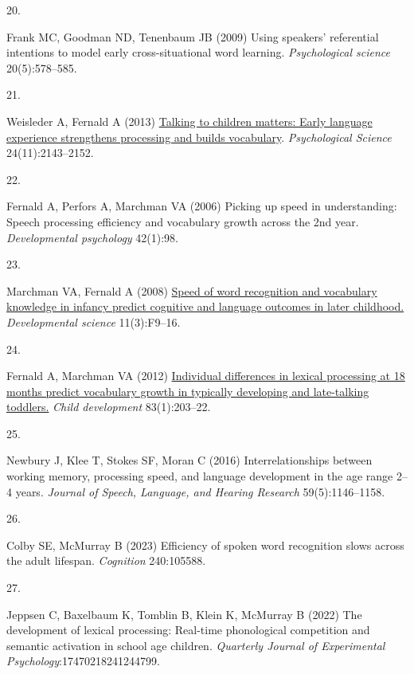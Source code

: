 \documentclass[9pt,twocolumn,twoside,]{pnas-new}
\newlength{\cslhangindent}
\newlength{\csllabelwidth}
\newenvironment{CSLReferences}[2] %
 {\begin{list}{}{%
  \setlength{\itemindent}{0pt}
  \setlength{\leftmargin}{0pt}
  \setlength{\parsep}{0pt}
  \ifodd #1
   \setlength{\leftmargin}{\cslhangindent}
   \setlength{\itemindent}{-1\cslhangindent}
  \fi
  \setlength{\itemsep}{#2\baselineskip}}}
 {\end{list}}
\newcommand{\CSLLeftMargin}[1]{\parbox[t]{\csllabelwidth}{#1}}
\newcommand{\CSLRightInline}[1]{\parbox[t]{\linewidth - \csllabelwidth}{#1}\break}
\begin{document}
\begin{CSLReferences}{0}{1}
\CSLLeftMargin{20. }%
\CSLRightInline{Frank MC, Goodman ND, Tenenbaum JB (2009) Using
speakers' referential intentions to model early cross-situational word
learning. \emph{Psychological science} 20(5):578--585.}

\CSLLeftMargin{21. }%
\CSLRightInline{Weisleder A, Fernald A (2013)
\href{https://doi.org/10.1177/0956797613488145}{{Talking to children
matters: Early language experience strengthens processing and builds
vocabulary}}. \emph{Psychological Science} 24(11):2143--2152.}

\CSLLeftMargin{22. }%
\CSLRightInline{Fernald A, Perfors A, Marchman VA (2006) Picking up
speed in understanding: Speech processing efficiency and vocabulary
growth across the 2nd year. \emph{Developmental psychology} 42(1):98.}

\CSLLeftMargin{23. }%
\CSLRightInline{Marchman VA, Fernald A (2008)
\href{https://www.ncbi.nlm.nih.gov/pubmed/18466367}{{Speed of word
recognition and vocabulary knowledge in infancy predict cognitive and
language outcomes in later childhood.}} \emph{Developmental science}
11(3):F9--16.}

\CSLLeftMargin{24. }%
\CSLRightInline{Fernald A, Marchman VA (2012)
\href{https://www.ncbi.nlm.nih.gov/pubmed/22172209}{{Individual
differences in lexical processing at 18 months predict vocabulary growth
in typically developing and late-talking toddlers.}} \emph{Child
development} 83(1):203--22.}

\CSLLeftMargin{25. }%
\CSLRightInline{Newbury J, Klee T, Stokes SF, Moran C (2016)
Interrelationships between working memory, processing speed, and
language development in the age range 2--4 years. \emph{Journal of
Speech, Language, and Hearing Research} 59(5):1146--1158.}

\CSLLeftMargin{26. }%
\CSLRightInline{Colby SE, McMurray B (2023) Efficiency of spoken word
recognition slows across the adult lifespan. \emph{Cognition}
240:105588.}

\CSLLeftMargin{27. }%
\CSLRightInline{Jeppsen C, Baxelbaum K, Tomblin B, Klein K, McMurray B
(2022) The development of lexical processing: Real-time phonological
competition and semantic activation in school age children.
\emph{Quarterly Journal of Experimental Psychology}:17470218241244799.}


\end{CSLReferences}
\end{document}
